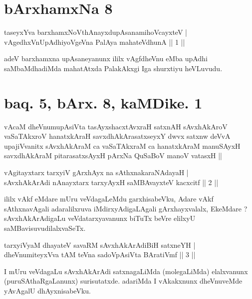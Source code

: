 
\section*{bArxhamxNa 8}

\begin{shl}
taseyxYva barxhamxNoV\s thAnayxdupAsanamihoVcayxteV | \\
vAgedhxVnUpAdhiyoVgeVna PalAya mahateV\s dhunA \hfill ||  1 || 
\end{shl}

\begin{artha}
adeV barxhamxna upAsaneyanunx ililx vAgfdheVnu eMba upAdhi saMbaMdhadiMda mahatAtxda PalakAkxgi Iga shurxtiyu heVLuvudu.
\end{artha}

\section*{baq. 5, bArx. 8, kaMDike. 1}

\begin{shl}
vAcaM dheVnumupAsiVta tasAyxshacxtAvxraH satxnAH sAvxhAkAroV vaSaTAkxroV hanatxkAraH savxdhAkArasatxseyxY dwvx satxnw deVvA upajiVvanitx sAvxhAkAraM ca vaSaTAkxraM ca hanatxkAraM manuSAyxH savxdhAkAraM pitarasatxsAyxH pArxNa QuSaBoV manoV vatasxH ||
\end{shl}


\begin{shl}
vAgitayxtarx tarxyiV gArxhAyx na sAthxnakaraNAdayaH | \\
sAvxhAkArAdi nAnayxtarx tarxyAyxH saMBAvayxteV kacxcitf \hfill ||  2 || 
\end{shl}

\begin{artha}
ililx vAkf eMdare mUru veVdagaLeMdu garxhisabeVku, Adare vAkf sAthxnavAgali adaralilxruva iMdirxyAdigaLAgali gArxhayxvalalx, EkeMdare ? sAvxhAkArAdigaLu veVdatarxyavanunx biTuTx beVre elilxyU saMBavisuvudilalxvaSeTx.
\end{artha}

\begin{shl}
tarxyiVyaM dhayateV savaRM sAvxhAkArAdiBiH satxneYH | \\
dheVnumiteyxVva tAM teVna sadoVpAsiVta BAratiVmf \hfill ||  3 || 
\end{shl}

\begin{artha}
I mUru veVdagaLu sAvxhAkArAdi satxnagaLiMda (molegaLiMda) elalxvanunx (puruSAthaRgaLanunx) surisutatxde. adariMda I vAkakxnunx dheVnuveMde yAvAgalU dhAyxnisabeVku.
\end{artha}

